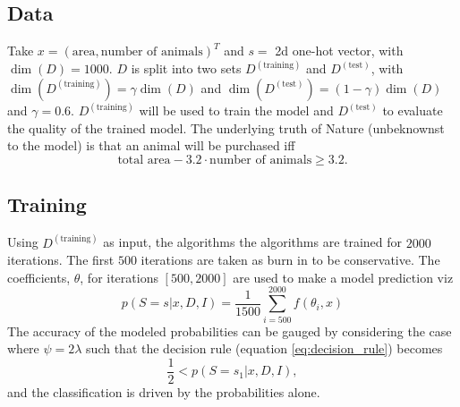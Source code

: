\begin{example}
	
	
	
	\subsection{Data}
	Take $x=(\text{area},\text{number of animals})^T$ and $s=$ 2d one-hot vector, with $\dim(D)=1000$. $D$ is split into two sets $D^{(\text{training})}$ and $D^{(\text{test})}$, with $\dim(D^{(\text{training})})=\gamma\dim(D)$ and $\dim(D^{(\text{test})})=(1-\gamma)\dim(D)$ and $\gamma=0.6$. $D^{(\text{training})}$ will be used to train the model and $D^{(\text{test})}$ to evaluate the quality of the trained model. The underlying truth of Nature (unbeknownst to the model) is that an animal will be purchased iff
	\begin{equation}
		\text{total area}- 3.2\cdot\text{number of animals}\geq 3.2.
		\label{eq:nature}
	\end{equation}
	
	\subsection{Training}
	Using $D^{(\text{training})}$ as input, the algorithms the algorithms are trained for $2000$ iterations. The first $500$ iterations are taken as burn in to be conservative. The coefficients, $\theta$, for iterations $[500,2000]$ are used to make a model prediction viz
	\begin{equation}
		p(S= s|x,D,I)=\frac{1}{1500}\sum_{i=500}^{2000}f(\theta_i,x)
	\end{equation}
	The accuracy of the modeled probabilities can be gauged by considering the case where $\psi=2\lambda$ such that the decision rule (equation \eqref{eq:decision_rule}) becomes
	\begin{equation}
		\frac{1}{2} < p(S= s_1|x,D,I),
		\label{eq:decision_rule2}
	\end{equation}
	and the classification is driven by the probabilities alone. 
	
	

\end{example}
